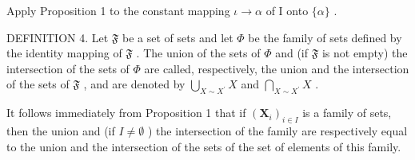 Apply Proposition 1 to the constant mapping \(\iota\to\alpha\) of I onto \(\{\alpha\}\) .

DEFINITION 4. Let \(\mathfrak{F}\) be a set of sets and let \(\Phi\) be the family of sets defined by the identity mapping of \(\mathfrak{F}\) . The union of the sets of \(\Phi\) and (if \(\mathfrak{F}\) is not empty) the intersection of the sets of \(\Phi\) are called, respectively, the union and the intersection of the sets of \(\mathfrak{F}\) , and are denoted by \(\bigcup_{X\sim X^{\prime}}X\) and \(\bigcap_{X\sim X^{\prime}}X\) .

It follows immediately from Proposition 1 that if \((\mathbf{X}_i)_{i\in I}\) is a family of sets, then the union and (if \(I\neq \emptyset\) ) the intersection of the family are respectively equal to the union and the intersection of the sets of the set of elements of this family.

